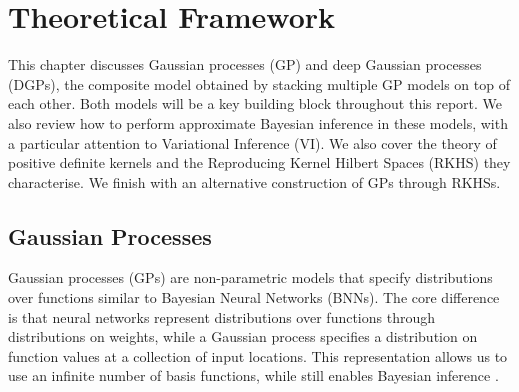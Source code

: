 \ifpdf
    \graphicspath{{Chapter2/Figs/Vector/}{Chapter2/Figs/PDF/}{Chapter2/Figs/}}
\else
    \graphicspath{{Chapter2/Figs/Raster/}{Chapter2/Figs/}}
\fi


\chapter{Theoretical Framework}
\label{chapter:theoretical-framework}

This chapter discusses Gaussian processes (GP) and deep Gaussian processes (DGPs), the composite model obtained by stacking multiple GP models on top of each other. Both models will be a key building block throughout this report. We also review how to perform approximate Bayesian inference in these models, with a particular attention to Variational Inference (VI). We also cover the theory of positive definite kernels and the Reproducing Kernel Hilbert Spaces (RKHS) they characterise. We finish with an alternative construction of GPs through RKHSs.

\section{Gaussian Processes}
\label{sec:chapter1:gp}


Gaussian processes (GPs) \citep{rasmussen2006} are non-parametric models that specify distributions over functions similar to Bayesian Neural Networks (BNNs). The core difference is that neural networks represent distributions over functions through distributions on weights, while a Gaussian process specifies a distribution on function values at a collection of input locations. This representation allows us to use an infinite number of basis functions, while still enables Bayesian inference \citep{neal1996bayesian}. 

